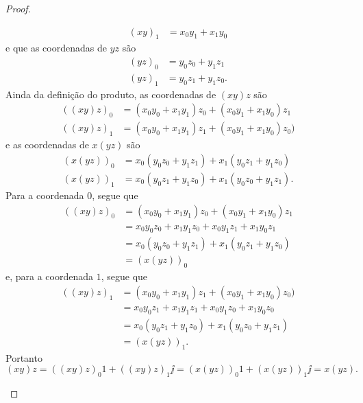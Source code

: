 \begin{proof}
\begin{itemize}
\begin{align*}
			(xy)_1 &= x_0y_1+x_1y_0
			\end{align*}
		e que as coordenadas de $yz$ são
			\begin{align*}
			(yz)_0 &= y_0z_0+y_1z_1 \\
			(yz)_1 &= y_0z_1+y_1z_0.
			\end{align*}
		Ainda da definição do produto, as coordenadas de $(xy)z$ são
			\begin{align*}
			((xy)z)_0 &= (x_0y_0 + x_1y_1)z_0 + (x_0y_1+x_1y_0)z_1 \\
			((xy)z)_1 &= (x_0y_0 + x_1y_1)z_1 + (x_0y_1+x_1y_0)z_0)
			\end{align*}
		e as coordenadas de $x(yz)$ são
			\begin{align*}
			(x(yz))_0 &= x_0(y_0z_0+y_1z_1) + x_1(y_0z_1+y_1z_0) \\
			(x(yz))_1 &= x_0(y_0z_1+y_1z_0) + x_1(y_0z_0+y_1z_1).
			\end{align*}
		Para a coordenada $0$, segue que
			\begin{align*}
			((xy)z)_0 &= (x_0y_0 + x_1y_1)z_0 + (x_0y_1+x_1y_0)z_1 \\
				&= x_0y_0z_0 + x_1y_1z_0 + x_0y_1z_1+x_1y_0z_1 \\
				&= x_0(y_0z_0+y_1z_1) + x_1(y_0z_1+y_1z_0) \\
				&= (x(yz))_0
			\end{align*}
		e, para a coordenada $1$, segue que
			\begin{align*}
			((xy)z)_1 &= (x_0y_0 + x_1y_1)z_1 + (x_0y_1+x_1y_0)z_0) \\
				&= x_0y_0z_1 + x_1y_1z_1 + x_0y_1z_0+x_1y_0z_0 \\
				&= x_0(y_0z_1+y_1z_0) + x_1(y_0z_0+y_1z_1) \\
				&= (x(yz))_1.
			\end{align*}
		Portanto
			\begin{equation*}
			(xy)z = ((xy)z)_0 1 + ((xy)z)_1 \jj = (x(yz))_0 1 + (x(yz))_1 \jj = x(yz).
			\end{equation*}




\end{itemize}
\end{proof}
